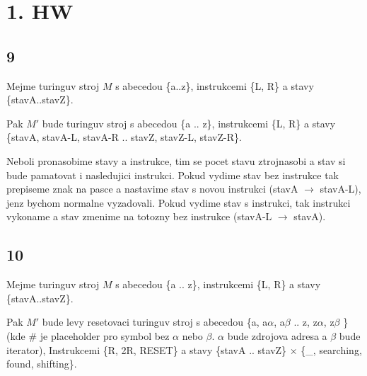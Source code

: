 \documentclass[a4paper]{article}
\begin{document}
\pagestyle{fancy}

\section*{1. HW}
\subsection*{9}
Mejme turinguv stroj $M$ s abecedou \{a..z\}, instrukcemi \{L, R\} a stavy \{stavA..stavZ\}.

Pak $M'$ bude turinguv stroj s abecedou \{a .. z\}, instrukcemi \{L, R\} a stavy \{stavA, stavA-L, stavA-R .. stavZ, stavZ-L, stavZ-R\}.  

Neboli pronasobime stavy a instrukce, tim se pocet stavu ztrojnasobi a stav si bude pamatovat i nasledujici instrukci.  
Pokud vydime stav bez instrukce tak prepiseme znak na pasce a nastavime stav s novou instrukci (stavA $\rightarrow$ stavA-L), jenz bychom normalne vyzadovali.
Pokud vydime stav s instrukci, tak instrukci vykoname a stav zmenime na totozny bez instrukce (stavA-L $\rightarrow$ stavA).

\subsection*{10}
Mejme turinguv stroj $M$ s abecedou \{a .. z\}, instrukcemi \{L, R\} a stavy \{stavA..stavZ\}.

Pak $M'$ bude levy resetovaci turinguv stroj s abecedou
\{a, a$\alpha$, a$\beta$ .. z, z$\alpha$, z$\beta$ \}
(kde \# je placeholder pro symbol bez $\alpha$ nebo $\beta$. $\alpha$ bude zdrojova adresa a $\beta$ bude iterator),
Instrukcemi \{R, 2R, RESET\} a stavy \{stavA .. stavZ\} $\times$ \{\_, searching, found, shifting\}.
\end{document}
